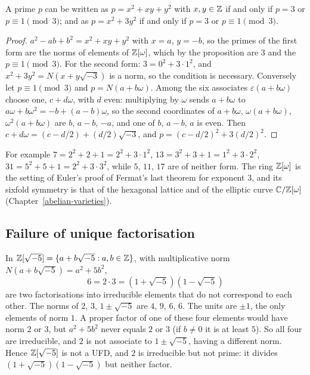 \begin{corollary}\label{number-theory:corollary-eisenstein-primes}
A prime $p$ can be written as $p = x^2 + xy + y^2$ with $x, y \in \mathbb{Z}$ if and only if $p = 3$ or $p \equiv 1 \pmod 3$; and as $p = x^2 + 3y^2$ if and only if $p = 3$ or $p \equiv 1 \pmod 3$.
\end{corollary}

\begin{proof}
$a^2 - ab + b^2 = x^2 + xy + y^2$ with $x = a$, $y = -b$, so the primes of the first form are the norms of elements of $\mathbb{Z}[\omega]$, which by the proposition are $3$ and the $p \equiv 1 \pmod 3$. For the
second form: $3 = 0^2 + 3 \cdot 1^2$, and $x^2 + 3y^2 = N(x + y\sqrt{-3})$ is a norm, so the condition is necessary. Conversely let $p \equiv 1 \pmod 3$ and $p = N(a + b\omega)$. Among the six associates
$\varepsilon(a + b\omega)$ choose one, $c + d\omega$, with $d$ even: multiplying by $\omega$ sends $a + b\omega$ to $a\omega + b\omega^2 = -b + (a - b)\omega$, so the second coordinates of
$a + b\omega$, $\omega(a + b\omega)$, $\omega^2(a + b\omega)$ are $b$, $a - b$, $-a$, and one of $b$, $a - b$, $a$ is even. Then $c + d\omega = (c - d/2) + (d/2)\sqrt{-3}$, and
$p = (c - d/2)^2 + 3(d/2)^2$.
\end{proof}

For example $7 = 2^2 + 2 + 1 = 2^2 + 3 \cdot 1^2$, $13 = 3^2 + 3 + 1 = 1^2 + 3 \cdot 2^2$, $31 = 5^2 + 5 + 1 = 2^2 + 3 \cdot 3^2$, while $5$, $11$, $17$ are of neither form. The ring $\mathbb{Z}[\omega]$ is
the setting of Euler's proof of Fermat's last theorem for exponent $3$, and its sixfold symmetry is that of the hexagonal lattice and of the elliptic curve $\mathbb{C}/\mathbb{Z}[\omega]$
(Chapter~\ref{abelian-varieties}).

\subsection{Failure of unique factorisation}\label{number-theory:subsection-failure-ufd}

\begin{example}\label{number-theory:example-sqrt-minus-five}
In $\mathbb{Z}[\sqrt{-5}] = \{a + b\sqrt{-5} : a, b \in \mathbb{Z}\}$, with multiplicative norm $N(a + b\sqrt{-5}) = a^2 + 5b^2$,
\[
6 = 2 \cdot 3 = (1 + \sqrt{-5})(1 - \sqrt{-5})
\]
are two factorisations into irreducible elements that do not correspond to each other. The norms of $2$, $3$, $1 \pm \sqrt{-5}$ are $4$, $9$, $6$, $6$. The units are $\pm1$, the only elements of norm $1$. A
proper factor of one of these four elements would have norm $2$ or $3$, but $a^2 + 5b^2$ never equals $2$ or $3$ (if $b \neq 0$ it is at least $5$). So all four are irreducible, and $2$ is not associate to
$1 \pm \sqrt{-5}$, having a different norm. Hence $\mathbb{Z}[\sqrt{-5}]$ is not a UFD, and $2$ is irreducible but not prime: it divides $(1 + \sqrt{-5})(1 - \sqrt{-5})$ but neither factor.
\end{example}

